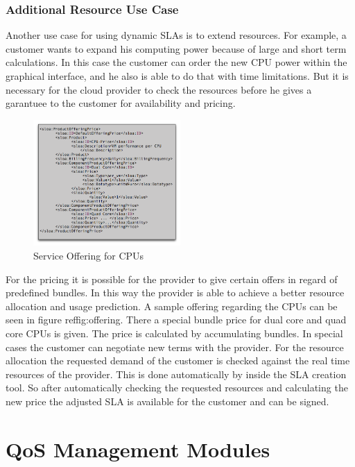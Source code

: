 \subsubsection{Additional Resource Use Case}
Another use case for using dynamic SLAs is to extend resources. For example, a customer wants to expand his computing power because of large and short term calculations. In this case the customer can order the new CPU power within the graphical interface, and he also is able to do that with time limitations. But it is necessary for the cloud provider to check the resources before he gives a garantuee to the customer for availability and pricing. 

\begin{figure}[ht]
		\centering
\includegraphics[width=0.5\textwidth]{fig/offering.png}
\caption{Service Offering for CPUs}
\label{fig:offering}
\end{figure}

For the pricing it is possible for the provider to give certain offers in regard of predefined bundles. In this way the provider is able to achieve a better resource allocation and usage prediction. A sample offering regarding the CPUs can be seen in figure ref{fig:offering}. There a special bundle price for dual core and quad core CPUs is given. The price is calculated by accumulating bundles. In special cases the customer can negotiate new terms with the provider. For the resource allocation the requested demand of the customer is checked against the real time resources of the provider. This is done automatically by inside the SLA creation tool. So after automatically checking the requested resources and calculating the new price the adjusted SLA is available for the customer and can be signed.


\section{QoS Management Modules}

